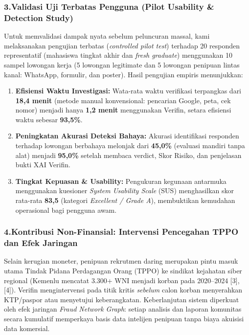 \documentclass[12pt,a4paper]{article}
\begin{document}
\subsubsection*{3.\quad Validasi Uji Terbatas Pengguna (Pilot Usability \& Detection Study)}
Untuk memvalidasi dampak nyata sebelum peluncuran massal, kami melaksanakan pengujian terbatas (\textit{controlled pilot test})
terhadap 20 responden representatif (mahasiswa tingkat akhir dan \textit{fresh graduate}) menggunakan 10 sampel
lowongan kerja (5 lowongan legitimate dan 5 lowongan penipuan lintas kanal: WhatsApp, formulir, dan poster).
Hasil pengujian empiris menunjukkan:
\begin{enumerate}[label=\textbf{\alph*.}]
\item \textbf{Efisiensi Waktu Investigasi:} Wata-rata waktu verifikasi terpangkas dari \textbf{18,4 menit}
      (metode manual konvensional: pencarian Google, peta, cek nomor) menjadi hanya \textbf{1,2 menit} menggunakan
      Verifin, setara efisiensi waktu sebesar \textbf{93,5\%}.
\item \textbf{Peningkatan Akurasi Deteksi Bahaya:} Akurasi identifikasi responden terhadap lowongan berbahaya melonjak
      dari \textbf{45,0\%} (evaluasi mandiri tanpa alat) menjadi \textbf{95,0\%} setelah membaca verdict, Skor Risiko,
      dan penjelasan bukti XAI Verifin.
\item \textbf{Tingkat Kepuasan \& Usability:} Pengukuran kegunaan antarmuka menggunakan kuesioner \textit{System Usability Scale}
      (SUS) menghasilkan skor rata-rata \textbf{83,5} (kategori \textit{Excellent / Grade A}), membuktikan kemudahan
      operasional bagi pengguna awam.
\end{enumerate}

\subsubsection*{4.\quad Kontribusi Non-Finansial: Intervensi Pencegahan TPPO dan Efek Jaringan}
Selain kerugian moneter, penipuan rekrutmen daring merupakan pintu masuk utama Tindak Pidana Perdagangan Orang (TPPO)
ke sindikat kejahatan siber regional (Kemenlu mencatat 3.300+ WNI menjadi korban pada 2020--2024 [3], [4]). Verifin
mengintervensi pada titik kritis \textit{sebelum} calon korban menyerahkan KTP/paspor atau menyetujui keberangkatan.
Keberlanjutan sistem diperkuat oleh efek jaringan \textit{Fraud Network Graph}: setiap analisis dan laporan komunitas
secara kumulatif memperkaya basis data intelijen penipuan tanpa biaya akuisisi data komersial.
\end{document}
